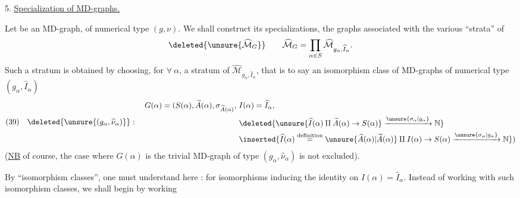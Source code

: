 5. \uline{Specialization  of MD-graphs.}

Let
be an MD-graph, of numerical type $(g,\nu)$. We shall construct its  specializations,  the graphs associated with the various ``strata'' of
\[
\deleted{\unsure{\widehat{\mathcal M}_G}}\qquad\widehat{\mathcal M}_G=\prod_{\alpha\in S}\widehat{\mathcal M}_{g_\alpha,\widehat I_\alpha}.
\]
Such a stratum is obtained by choosing, for $\forall\ \alpha$, a stratum of $\widehat{\mathcal M}_{g_\alpha,\widehat I_\alpha}$, that is to say an isomorphism class of MD-graphs
of numerical type  $(g_\alpha,\widehat I_\alpha)$
\[
(39)\quad\deleted{\unsure{(g_\alpha,\widehat\nu_\alpha)}}:\quad
\begin{aligned}
G(\alpha)=(S(\alpha),\widetilde A(\alpha),\sigma_{\widetilde A(\alpha)},\ &I(\alpha)=\widehat I_\alpha,\\
&\deleted{\unsure{\widehat I(\alpha)\amalg\widetilde A(\alpha)\to S(\alpha)}\xrightarrow{\unsure{\sigma_\alpha|g_\alpha}}\mathbb N}\\
&\inserted{\widehat I(\alpha)\overset{\mathrm{definition}}{=}\unsure{\widehat A(\alpha)|\widetilde A(\alpha)}\amalg I(\alpha)\to S(\alpha)\xrightarrow{\unsure{\sigma_\alpha|g_\alpha}}\mathbb N})
\end{aligned}
\]
(\uline{NB} of course, the case where $G(\alpha)$ is the trivial MD-graph of type $(g_\alpha,\widehat\nu_\alpha)$ is not excluded).

By ``isomorphism classes'', one must understand here : for isomorphisms inducing the identity on $I(\alpha)=\widehat I_\alpha$. Instead of working with such isomorphism classes, we shall begin by working
